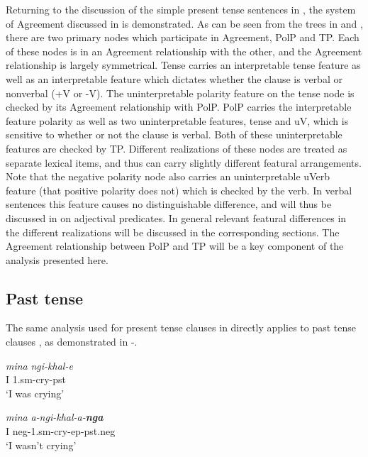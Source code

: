 \documentclass[output=paper]{langsci/langscibook}
\begin{document}
Returning to the discussion of the simple present tense sentences in , the system of Agreement discussed in  is demonstrated. As can be seen from the trees in  and , there are two primary nodes which participate in Agreement, PolP and TP. Each of these nodes is in an Agreement relationship with the other, and the Agreement relationship is largely symmetrical. Tense carries an interpretable tense feature as well as an interpretable feature which dictates whether the clause is verbal or nonverbal (+V or -V). The uninterpretable polarity feature on the tense node is checked by its Agreement relationship with PolP. PolP carries the interpretable feature polarity as well as two uninterpretable features, tense and uV, which is sensitive to whether or not the clause is verbal. Both of these uninterpretable features are checked by TP. Different realizations of these nodes are treated as separate lexical items, and thus can carry slightly different featural arrangements. Note that the negative polarity node also carries an uninterpretable uVerb feature (that positive polarity does not) which is checked by the verb. In verbal sentences this feature causes no distinguishable difference, and will thus be discussed in  on adjectival predicates. In general relevant featural differences in the different realizations will be discussed in the corresponding sections. The Agreement relationship between PolP and TP will be a key component of the analysis presented here.


\subsection{Past tense}

The same analysis used for present tense clauses in  directly applies to past tense clauses , as demonstrated in -.



\begin{exe}
\ex\label{ex:burkholder:9} \begin{xlist}
\ex\label{ex:burkholder:9a} \gll \textit{mina} \textit{ngi-khal-e}\\
         I 1.{\sc sm}-cry-{\sc pst}\\
    \glt `I was crying'

\ex\label{ex:burkholder:9b} \gll \textit{mina} \textit{a-ngi-khal-a-\textbf{nga}}\\
         I {\sc neg}-1.{\sc sm}-cry-{\sc ep}-{\sc pst.neg}\\
    \glt `I wasn't crying'
\end{xlist}
\end{exe}
\end{document}
